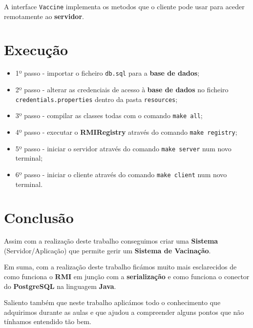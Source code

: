 \documentclass[11pt]{article}
\begin{document}
\hspace{0,5cm} A interface \verb|Vaccine| implementa os metodos que o cliente pode usar para
aceder remotamente ao \textbf{servidor}.

\section{Execução}

\begin{itemize}
    \item 1º passo - importar o ficheiro \verb|db.sql| para a \textbf{base de dados};
    \item 2º passo - alterar as credenciais de acesso à \textbf{base de dados} no ficheiro
    \verb|credentials.properties| dentro da pasta \verb|resources|;
    \item 3º passo - compilar as classes todas com o comando \verb|make all|;
    \item 4º passo - executar o \textbf{RMIRegistry} através do comando \verb|make registry|;
    \item 5º passo - iniciar o servidor através do comando \verb|make server| num novo terminal;
    \item 6º passo - iniciar o cliente através do comando \verb|make client| num novo terminal.
\end{itemize}

\section{Conclusão}

\hspace{0,5cm}Assim com a realização deste trabalho conseguimos criar uma \textbf{Sistema}
(Servidor/Aplicação) que permite gerir um \textbf{Sistema de Vacinação}.

Em suma, com a realização deste trabalho ficámos muito mais esclarecidos de como funciona o
\textbf{RMI} em junção com a \textbf{serialização} e como funciona o conector do \textbf{PostgreSQL}
na linguagem \textbf{Java}.

Saliento também que neste trabalho aplicámos todo o conhecimento que adquirimos durante as aulas e que
ajudou a compreender alguns pontos que não tínhamos entendido tão bem.
\end{document}
